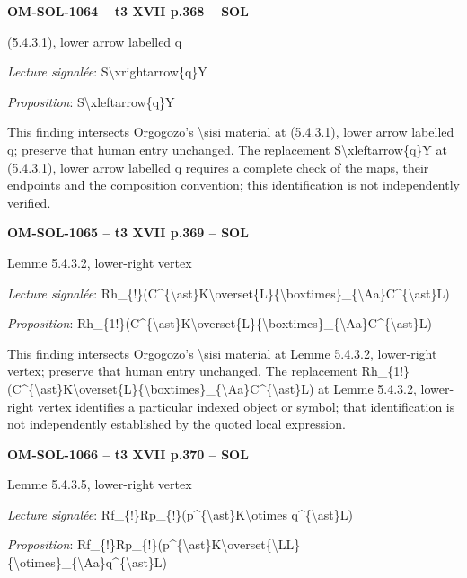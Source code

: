 \par\noindent\textbf{OM-SOL-1064 -- t3 XVII p.368 -- SOL}\par
(5.4.3.1), lower arrow labelled q\par
\emph{Lecture signalée}: S\textbackslash{}xrightarrow\{q\}Y\par
\emph{Proposition}: S\textbackslash{}xleftarrow\{q\}Y\par
This finding intersects Orgogozo's \textbackslash{}sisi material at (5.4.3.1), lower arrow labelled q; preserve that human entry unchanged. The replacement S\textbackslash{}xleftarrow\{q\}Y at (5.4.3.1), lower arrow labelled q requires a complete check of the maps, their endpoints and the composition convention; this identification is not independently verified.\par
\par\noindent\textbf{OM-SOL-1065 -- t3 XVII p.369 -- SOL}\par
Lemme 5.4.3.2, lower-right vertex\par
\emph{Lecture signalée}: Rh\_\{!\}(C\textasciicircum{}\{\textbackslash{}ast\}K\textbackslash{}overset\{L\}\{\textbackslash{}boxtimes\}\_\{\textbackslash{}Aa\}C\textasciicircum{}\{\textbackslash{}ast\}L)\par
\emph{Proposition}: Rh\_\{1!\}(C\textasciicircum{}\{\textbackslash{}ast\}K\textbackslash{}overset\{L\}\{\textbackslash{}boxtimes\}\_\{\textbackslash{}Aa\}C\textasciicircum{}\{\textbackslash{}ast\}L)\par
This finding intersects Orgogozo's \textbackslash{}sisi material at Lemme 5.4.3.2, lower-right vertex; preserve that human entry unchanged. The replacement Rh\_\{1!\}(C\textasciicircum{}\{\textbackslash{}ast\}K\textbackslash{}overset\{L\}\{\textbackslash{}boxtimes\}\_\{\textbackslash{}Aa\}C\textasciicircum{}\{\textbackslash{}ast\}L) at Lemme 5.4.3.2, lower-right vertex identifies a particular indexed object or symbol; that identification is not independently established by the quoted local expression.\par
\par\noindent\textbf{OM-SOL-1066 -- t3 XVII p.370 -- SOL}\par
Lemme 5.4.3.5, lower-right vertex\par
\emph{Lecture signalée}: Rf\_\{!\}Rp\_\{!\}(p\textasciicircum{}\{\textbackslash{}ast\}K\textbackslash{}otimes q\textasciicircum{}\{\textbackslash{}ast\}L)\par
\emph{Proposition}: Rf\_\{!\}Rp\_\{!\}(p\textasciicircum{}\{\textbackslash{}ast\}K\textbackslash{}overset\{\textbackslash{}LL\}\{\textbackslash{}otimes\}\_\{\textbackslash{}Aa\}q\textasciicircum{}\{\textbackslash{}ast\}L)\par

